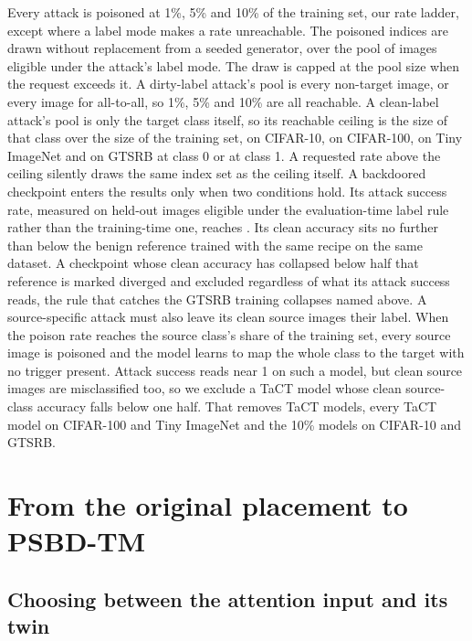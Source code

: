 Every attack is poisoned at 1\%, 5\% and 10\% of the training set, our rate ladder, except where a label mode makes a rate unreachable. The poisoned indices are drawn without replacement from a seeded generator, over the pool of images eligible under the attack's label mode. The draw is capped at the pool size when the request exceeds it. A dirty-label attack's pool is every non-target image, or every image for all-to-all, so 1\%, 5\% and 10\% are all reachable. A clean-label attack's pool is only the target class itself, so its reachable ceiling is the size of that class over the size of the training set, \CleanLabelCapCifarOneZeroClassZero{} on CIFAR-10, \CleanLabelCapCifarOneZeroZeroClassZero{} on CIFAR-100, \CleanLabelCapTinyClassZero{} on Tiny ImageNet and \CleanLabelCapGtsrbClassZero{} on GTSRB at class 0 or \CleanLabelCapGtsrbClassOne{} at class 1. A requested rate above the ceiling silently draws the same index set as the ceiling itself. A backdoored checkpoint enters the results only when two conditions hold. Its attack success rate, measured on held-out images eligible under the evaluation-time label rule rather than the training-time one, reaches \AsrBar{}. Its clean accuracy sits no further than \CleanDropBar{} below the benign reference trained with the same recipe on the same dataset. A checkpoint whose clean accuracy has collapsed below half that reference is marked diverged and excluded regardless of what its attack success reads, the rule that catches the GTSRB training collapses named above. A source-specific attack must also leave its clean source images their label. When the poison rate reaches the source class's share of the training set, every source image is poisoned and the model learns to map the whole class to the target with no trigger present. Attack success reads near 1 on such a model, but clean source images are misclassified too, so we exclude a TaCT model whose clean source-class accuracy falls below one half. That removes \PanelCellsSourceMapped{} TaCT models, every TaCT model on CIFAR-100 and Tiny ImageNet and the 10\% models on CIFAR-10 and GTSRB.

\section{From the original placement to PSBD-TM}
\label{app:placements}

\subsection{Choosing between the attention input and its twin}
\label{app:protocol}

